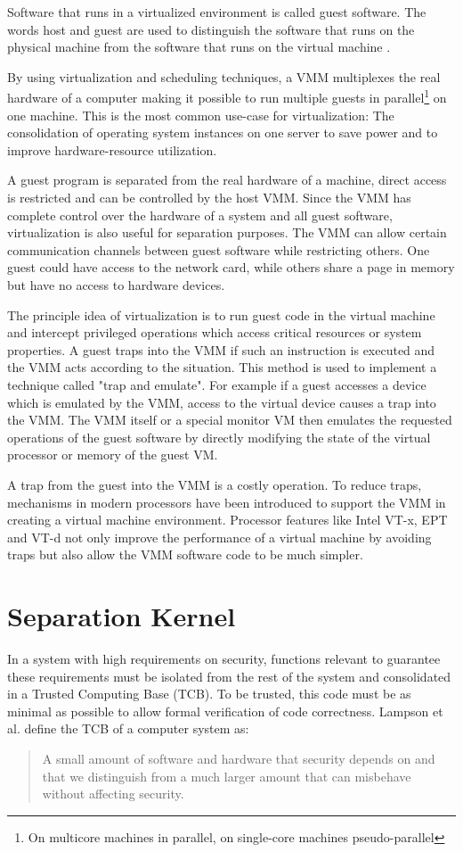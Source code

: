 Software that runs in a virtualized environment is called guest software. The
words host and guest are used to distinguish the software that runs on the
physical machine from the software that runs on the virtual machine
\cite{wiki:virtualization}.

By using virtualization and scheduling techniques, a VMM multiplexes the real
hardware of a computer making it possible to run multiple guests in
parallel\footnote{On multicore machines in parallel, on single-core machines
pseudo-parallel} on one machine. This is the most common use-case for
virtualization: The consolidation of operating system instances on one server to
save power and to improve hardware-resource utilization.

A guest program is separated from the real hardware of a machine, direct access
is restricted and can be controlled by the host VMM. Since the VMM has complete
control over the hardware of a system and all guest software, virtualization is
also useful for separation purposes. The VMM can allow certain communication
channels between guest software while restricting others. One guest could have
access to the network card, while others share a page in memory but have no
access to hardware devices.

The principle idea of virtualization is to run guest code in the virtual machine
and intercept privileged operations which access critical resources or system
properties. A guest traps into the VMM if such an instruction is executed and
the VMM acts according to the situation. This method is used to implement a
technique called "trap and emulate". For example if a guest accesses a device
which is emulated by the VMM, access to the virtual device causes a trap into
the VMM. The VMM itself or a special monitor VM then emulates the requested
operations of the guest software by directly modifying the state of the virtual
processor or memory of the guest VM.

A trap from the guest into the VMM is a costly operation. To reduce traps,
mechanisms in modern processors have been introduced to support the VMM in
creating a virtual machine environment. Processor features like Intel VT-x, EPT
and VT-d not only improve the performance of a virtual machine by avoiding traps
but also allow the VMM software code to be much simpler.

\section{Separation Kernel}
In a system with high requirements on security, functions relevant
to guarantee these requirements must be isolated from the rest of
the system and consolidated in a Trusted Computing Base (TCB).
To be trusted, this code must be as minimal as possible to allow formal
verification of code correctness. Lampson et al.
\cite{Lampson:1991:ADS:121133.121160} define the TCB of a computer system as:
\begin{quote}
	A small amount of software and hardware that security depends on and
	that we distinguish from a much larger amount that can misbehave without
	affecting security.
\end{quote}

